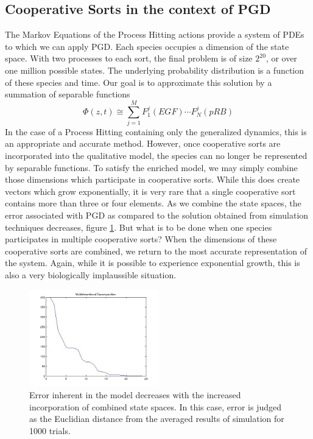 \documentclass{article}
\begin{document}
\subsection{Cooperative Sorts in the context of PGD}
The Markov Equations of the Process Hitting actions provide a system of PDEs to which we can apply PGD. Each species occupies a dimension of the state space. With two processes to each sort, the final problem is of size $2^{20}$, or over one million possible states. The underlying probability distribution is a function of these species and time. Our goal is to approximate this solution by a summation of separable functions 
\[
 \Phi(z,t)\cong \sum_{j=1}^{M}F_1^j(EGF)\cdots F_N^j(pRB)
\]
 In the case of a Process Hitting containing only the generalized dynamics, this is an appropriate and accurate method. However, once cooperative sorts are incorporated into the qualitative model, the species can no longer be represented by separable functions. To satisfy the enriched model, we may simply combine those dimensions which participate in cooperative sorts. While this does create vectors which grow exponentially, it is very rare that a single cooperative sort contains more than three or four elements. As we combine the state spaces, the error associated with PGD as compared to the solution obtained from simulation techniques decreases, figure \ref{error_coop}. But what is to be done when one species participates in multiple cooperative sorts? When the dimensions of these cooperative sorts are combined, we return to the most accurate representation of the system. Again, while it is possible to experience exponential growth, this is also a very biologically implaussible situation.\\
 
\begin{figure}[h!]
\centering
 \includegraphics[width=0.5\textwidth]{singular_full.jpg}
 \caption{Error inherent in the model decreases with the increased incorporation of combined state spaces. In this case, error is judged as the Euclidian distance from the averaged results of simulation for 1000 trials.}
 \label{error_coop}
\end{figure}
\end{document}

